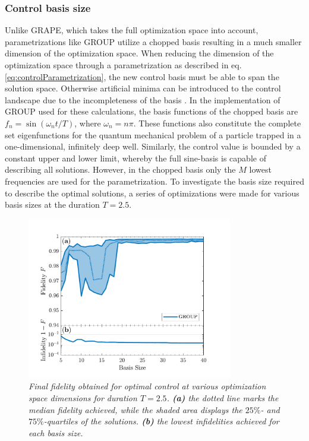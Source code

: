 \subsubsection{Control basis size}
Unlike GRAPE, which takes the full optimization space into account, parametrizations like GROUP utilize a chopped basis resulting in a much smaller dimension of the optimization space. When reducing the dimension of the optimization space through a parametrization as described in eq. \eqref{eq:controlParametrization}, the new control basis must be able to span the solution space. Otherwise artificial minima can be introduced to the control landscape due to the incompleteness of the basis \cite{Rach2015}. 
In the implementation of GROUP used for these calculations, the basis functions of the chopped basis are $f_n = \sin \left( \omega_n t / T \right)$, where $\omega_n = n \pi$. These functions also constitute the complete set eigenfunctions for the quantum mechanical problem of a particle trapped in a one-dimensional, infinitely deep well. Similarly, the control value is bounded by a constant upper and lower limit, whereby the full sine-basis is capable of describing all solutions. However, in the chopped basis only the $M$ lowest frequencies are used for the parametrization.
To investigate the basis size required to describe the optimal solutions, a series of optimizations were made for various basis sizes at the duration $T = 2.5$. 
\begin{figure}[h!]
    \centering
    \includegraphics[width=0.8\textwidth]{Figures/5part/BestFidelityBasisSize.pdf}
    \caption{\textit{Final fidelity obtained for optimal control at various optimization space dimensions for duration $T = 2.5$. \textbf{(a)} the dotted line marks the median fidelity achieved, while the shaded area displays the $25\%$- and $75\%$-quartiles of the solutions. \textbf{(b)} the lowest infidelities achieved for each basis size.}}
    \label{fig:FidelityBasisSize5}
\end{figure}
